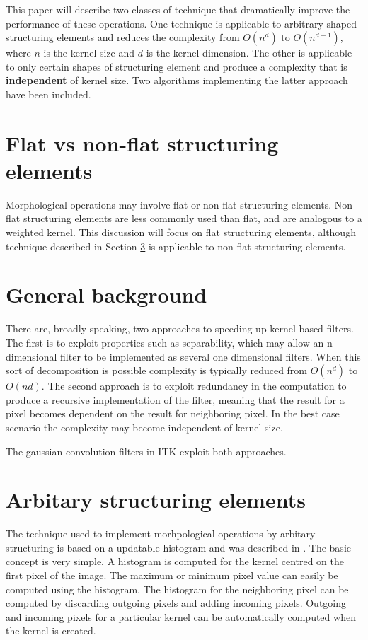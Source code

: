 \documentclass{InsightArticle}
\begin{document}
This paper will describe two classes of technique that dramatically
improve the performance of these operations. One technique is
applicable to arbitrary shaped structuring elements and reduces the
complexity from $O(n^d)$ to $O(n^{d-1})$, where $n$ is the kernel size
and $d$ is the kernel dimension. The other is applicable to only
certain shapes of structuring element and produce a complexity that is
{\bf independent} of kernel size. Two algorithms implementing the
latter approach have been included.

\section{Flat vs non-flat structuring elements}
Morphological operations may involve flat or non-flat structuring
elements. Non-flat structuring elements are less commonly used than
flat, and are analogous to a weighted kernel. This discussion will
focus on flat structuring elements, although technique described in
Section \ref{sect:movingHist} is applicable to non-flat structuring
elements.

\section{General background}
There are, broadly speaking, two approaches to speeding up kernel
based filters. The first is to exploit properties such as
separability, which may allow an n-dimensional filter to be
implemented as several one dimensional filters. When this sort of
decomposition is possible complexity is typically reduced from
$O(n^d)$ to $O(nd)$. The second approach is to exploit redundancy in
the computation to produce a recursive implementation of the filter,
meaning that the result for a pixel becomes dependent on the result
for neighboring pixel. In the best case scenario the complexity may
become independent of kernel size.

The gaussian convolution filters in ITK exploit both approaches.

\section{Arbitary structuring elements}
\label{sect:movingHist}
The technique used to implement morhpological operations by arbitary
structuring is based on a updatable histogram and was described in
\cite{Vandroogenbroeck96.3}. The basic concept is very simple.
A histogram is computed for the kernel centred on the first pixel of
the image. The maximum or minimum pixel value can easily be computed
using the histogram. The histogram for the neighboring pixel can be
computed by discarding outgoing pixels and adding incoming
pixels. Outgoing and incoming pixels for a particular kernel can be
automatically computed when the kernel is created.
\end{document}
